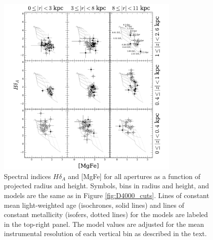 \begin{figure}[t]
  \centering
  \includegraphics[width=0.8\textwidth]{891_1/figs/MgFe_multires.pdf}
  \caption{\label{fig:MgFe_cuts}\fixspacing Spectral indices
    $H\delta_A$ and [MgFe] for all apertures as a function of
    projected radius and height. Symbols, bins in radius and height,
    and models are the same as in Figure \ref{fig:D4000_cuts}. Lines
    of constant mean light-weighted age (isochrones, solid lines) and
    lines of constant metallicity (isofers, dotted lines) for the
    models are labeled in the top-right panel. The model values are
    adjusted for the mean instrumental resolution of each vertical bin
    as described in the text.}
\end{figure}

